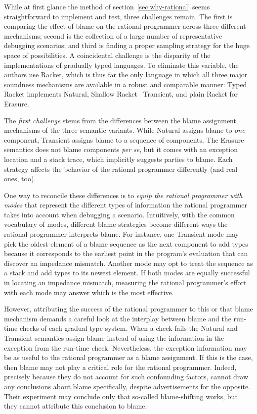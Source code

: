 
While at first glance the method of section~\ref{sec:why-rational} seems
straightforward to implement and test, three challenges remain. The first is
comparing the effect of blame on the rational programmer across three different
mechanisms; second is the collection of a large number of representative
debugging scenarios; and third is finding a proper sampling strategy for the
huge space of possibilities. A coincidental challenge is the disparity of the
implementations of gradually typed languages. To eliminate this variable, the
authors use Racket, which is thus far the only language in which all three major
soundness mechanisms are available in a robust and comparable manner:
Typed Racket implements Natural, Shallow Racket~\citep{ttt21}
Transient, and plain Racket for Erasure. 

The {\em first challenge\/} stems from the differences between the blame
assignment mechanisms of the three semantic variants.  While Natural assigns
blame to {\em one\/} component, Transient assigns blame to a sequence of
components. The Erasure semantics does not blame components {\it per se\/}, but
it comes with an exception location and a stack trace, which implicitly suggests
parties to blame.  Each strategy affects the behavior of the rational programmer
differently (and real ones, too).

One way to reconcile these differences is to {\em equip the rational
programmer with modes \/} that represent the different types of
information the rational programmer takes into account when debugging a
scenario. Intuitively, with the common vocabulary of modes, different
blame strategies become different ways the rational programmer  interprets
blame.  For instance, one Transient mode may pick the oldest element of a
blame sequence as the next component to add types because it corresponds to the
earliest point in the program's evaluation that can discover an impedance
mismatch.  Another mode may opt to treat the sequence as a stack and add
types to its newest element.  If both modes are equally successful in
locating an impedance mismatch, measuring the rational programmer's effort with each mode
may answer which is the most effective.


However, attributing the success of the rational programmer to this or
that blame mechanism demands a careful look at the interplay between blame
and the run-time checks of each gradual type system. When a check fails
the Natural and Transient semantics assign blame instead of using the
information in the exception from the run-time check. Nevertheless, the
exception information may be as useful to the rational
programmer as a blame assignment. If this is the case, then blame may not play a critical
role for the rational programmer. Indeed, precisely because they do not
account for such confounding factors, \citet{lksfd-popl-2020} cannot draw any
conclusions about blame specifically, despite advertisements for the
opposite. Their experiment may conclude only that so-called blame-shifting
works, but they cannot attribute this conclusion to blame. 


